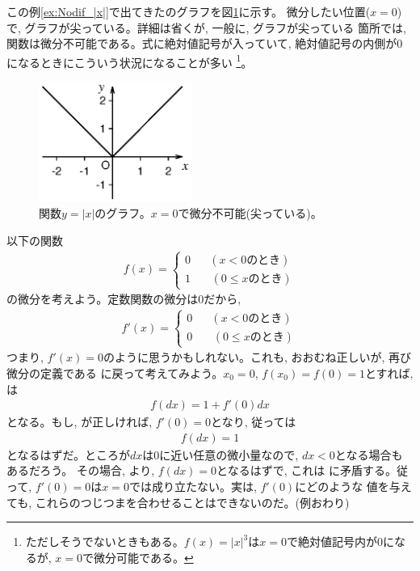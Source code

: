 この例\ref{ex:Nodif_|x|}で出てきたのグラフを図\ref{fig:abs_x}に示す。
微分したい位置($x=0$)で, グラフが尖っている。詳細は省くが, 一般に, グラフが尖っている
箇所では, 関数は微分不可能である。式に絶対値記号が入っていて, 絶対値記号の内側が0
になるときにこういう状況になることが多い
\footnote{ただしそうでないときもある。$f(x)=|x|^3$は$x=0$で絶対値記号内が0になるが, 
$x=0$で微分可能である。}。
\begin{figure}[h]
    \centering
    \includegraphics[width=5cm]{abs_x.eps}
    \caption{関数$y=|x|$のグラフ。$x=0$で微分不可能(尖っている)。}\label{fig:abs_x}
\end{figure}

\begin{exmpl}\label{ex:Nodif_01} 以下の関数
\begin{eqnarray}
f(x)=\begin{cases}
0\,\,\,\,\,\,\,\,\,\,(x<0\text{のとき})\\
1\,\,\,\,\,\,\,\,\,\,\,(0\leq x\text{のとき})
\end{cases}\label{eq:01'1}\end{eqnarray}
の微分を考えよう。定数関数の微分は0だから, 
\begin{eqnarray}
f'(x)=\begin{cases}
0\,\,\,\,\,\,\,\,\,\,(x<0\text{のとき})\\
0\,\,\,\,\,\,\,\,\,\,\,(0\leq x\text{のとき})
\end{cases}\label{eq:01'2}\end{eqnarray}
つまり, $f'(x)=0$のように思うかもしれない。これも, おおむね正しいが, 
 再び微分の定義である
に戻って考えてみよう。$x_0=0$, $f(x_0)=f(0)=1$とすれば, は
\begin{eqnarray}f(dx) = 1+f'(0)dx\label{eq:01'4}\end{eqnarray}
となる。もし, が正しければ, $f'(0)=0$となり, 従っては
\begin{eqnarray}f(dx) = 1\label{eq:01'5}\end{eqnarray}
となるはずだ。ところが$dx$は0に近い任意の微小量なので, $dx<0$となる場合もあるだろう。
その場合, より, $f(dx)=0$となるはずで, これは
に矛盾する。従って, $f'(0)=0$は$x=0$では成り立たない。実は, $f'(0)$にどのような
値を与えても, これらのつじつまを合わせることはできないのだ。(例おわり)
\end{exmpl}

